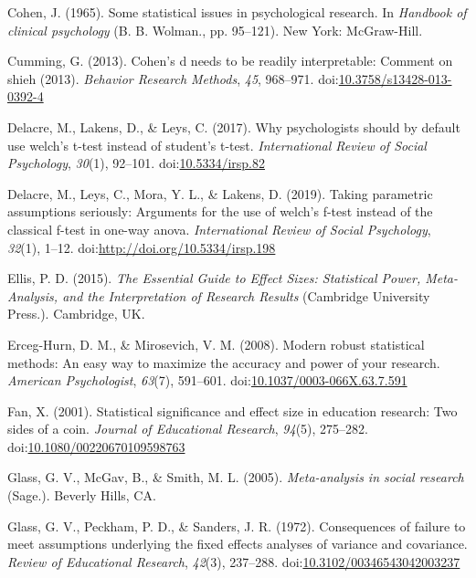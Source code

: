 \documentclass[
  man,floatsintext]{apa6}
\begin{document}
\leavevmode\hypertarget{ref-Cohen_1965}{}%
Cohen, J. (1965). Some statistical issues in psychological research. In \emph{Handbook of clinical psychology} (B. B. Wolman., pp. 95--121). New York: McGraw-Hill.

\leavevmode\hypertarget{ref-Cumming_2013}{}%
Cumming, G. (2013). Cohen's d needs to be readily interpretable: Comment on shieh (2013). \emph{Behavior Research Methods}, \emph{45}, 968--971. doi:\href{https://doi.org/10.3758/s13428-013-0392-4}{10.3758/s13428-013-0392-4}

\leavevmode\hypertarget{ref-Delacre_et_al_2017}{}%
Delacre, M., Lakens, D., \& Leys, C. (2017). Why psychologists should by default use welch's t-test instead of student's t-test. \emph{International Review of Social Psychology}, \emph{30}(1), 92--101. doi:\href{https://doi.org/10.5334/irsp.82}{10.5334/irsp.82}

\leavevmode\hypertarget{ref-Delacre_et_al_2019}{}%
Delacre, M., Leys, C., Mora, Y. L., \& Lakens, D. (2019). Taking parametric assumptions seriously: Arguments for the use of welch's f-test instead of the classical f-test in one-way anova. \emph{International Review of Social Psychology}, \emph{32}(1), 1--12. doi:\href{https://doi.org/http://doi.org/10.5334/irsp.198}{http://doi.org/10.5334/irsp.198}

\leavevmode\hypertarget{ref-Ellis_2015}{}%
Ellis, P. D. (2015). \emph{The Essential Guide to Effect Sizes: Statistical Power, Meta-Analysis, and the Interpretation of Research Results} (Cambridge University Press.). Cambridge, UK.

\leavevmode\hypertarget{ref-Erceg-Hurn_Mirosevich_2008}{}%
Erceg-Hurn, D. M., \& Mirosevich, V. M. (2008). Modern robust statistical methods: An easy way to maximize the accuracy and power of your research. \emph{American Psychologist}, \emph{63}(7), 591--601. doi:\href{https://doi.org/10.1037/0003-066X.63.7.591}{10.1037/0003-066X.63.7.591}

\leavevmode\hypertarget{ref-Fan_2001}{}%
Fan, X. (2001). Statistical significance and effect size in education research: Two sides of a coin. \emph{Journal of Educational Research}, \emph{94}(5), 275--282. doi:\href{https://doi.org/10.1080/00220670109598763}{10.1080/00220670109598763}

\leavevmode\hypertarget{ref-Glass_et_al_1981}{}%
Glass, G. V., McGav, B., \& Smith, M. L. (2005). \emph{Meta-analysis in social research} (Sage.). Beverly Hills, CA.

\leavevmode\hypertarget{ref-Glass_et_al_1972}{}%
Glass, G. V., Peckham, P. D., \& Sanders, J. R. (1972). Consequences of failure to meet assumptions underlying the fixed effects analyses of variance and covariance. \emph{Review of Educational Research}, \emph{42}(3), 237--288. doi:\href{https://doi.org/10.3102/00346543042003237}{10.3102/00346543042003237}
\end{document}
